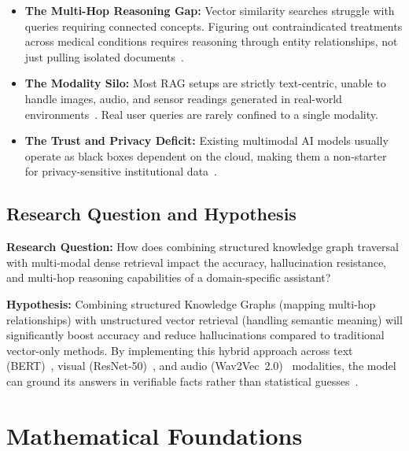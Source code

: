 \documentclass[12pt,a4paper]{article}
\theoremstyle{definition}
\theoremstyle{plain}
\theoremstyle{remark}
\begin{document}
\begin{itemize}[leftmargin=1.5em]
  \item \textbf{The Multi-Hop Reasoning Gap:} Vector similarity searches struggle with queries requiring connected concepts. Figuring out contraindicated treatments across medical conditions requires reasoning through entity relationships, not just pulling isolated documents~\cite{sarmah2024hybridrag}.

  \item \textbf{The Modality Silo:} Most RAG setups are strictly text-centric, unable to handle images, audio, and sensor readings generated in real-world environments~\cite{kadam2022multimodal}. Real user queries are rarely confined to a single modality.

  \item \textbf{The Trust and Privacy Deficit:} Existing multimodal AI models usually operate as black boxes dependent on the cloud, making them a non-starter for privacy-sensitive institutional data~\cite{pan2024unifying}.
\end{itemize}

\subsection{Research Question and Hypothesis}

\noindent\textbf{Research Question:} How does combining structured knowledge graph traversal with multi-modal dense retrieval impact the accuracy, hallucination resistance, and multi-hop reasoning capabilities of a domain-specific assistant?

\noindent\textbf{Hypothesis:} Combining structured Knowledge Graphs (mapping multi-hop relationships) with unstructured vector retrieval (handling semantic meaning) will significantly boost accuracy and reduce hallucinations compared to traditional vector-only methods. By implementing this hybrid approach across text (BERT)~\cite{devlin2019bert}, visual (ResNet-50)~\cite{he2016deep}, and audio (Wav2Vec~2.0)~\cite{baevski2020wav2vec} modalities, the model can ground its answers in verifiable facts rather than statistical guesses~\cite{kadam2022multimodal}.

\newpage
\section{Mathematical Foundations}
\label{sec:math}
\end{document}
